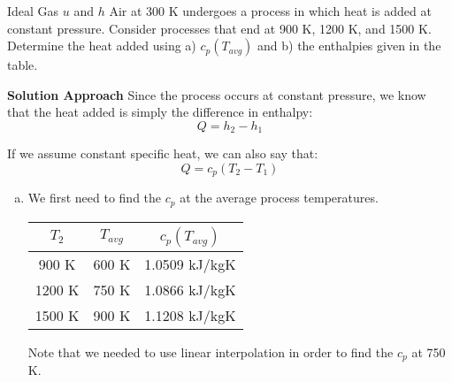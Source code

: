 \begin{example}{Ideal Gas $u$ and $h$}
  Air at 300 K undergoes a process in which heat is added at constant pressure.  Consider processes that end at 900 K, 1200 K, and 1500 K.
  Determine the heat added using a) $c_p(T_{avg})$ and b) the enthalpies given in the table.

  {\bf Solution Approach}
  Since the process occurs at constant pressure, we know that the heat added is simply the difference in enthalpy:
  \begin{equation*}
    Q = h_2 - h_1
  \end{equation*}

  If we assume constant specific heat, we can also say that:
  \begin{equation*}
    Q = c_p \left(T_2 - T_1\right)
  \end{equation*}

  \begin{enumerate}[a)]
  \item We first need to find the $c_p$ at the average process temperatures.
    \begin{center}
      \begin{tabular}{ccc}
        $T_2$ & $T_{avg}$ & $c_p(T_{avg})$ \\ \hline
        900 K & 600 K & 1.0509 kJ/kgK \\
        1200 K & 750 K & 1.0866 kJ/kgK \\
        1500 K & 900 K & 1.1208 kJ/kgK
      \end{tabular}
    \end{center}
    Note that we needed to use linear interpolation in order to find the $c_p$ at 750 K.


\end{enumerate}
\end{example}
